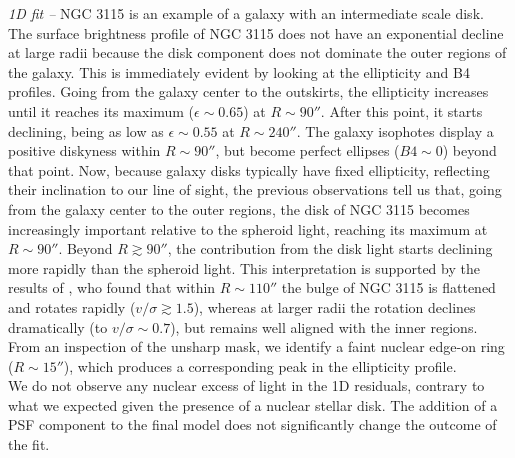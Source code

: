 \documentclass[preprint2]{emulateapj}
\begin{document}
  \emph{1D fit -- }
  NGC 3115 is an example of a galaxy with an intermediate scale disk.
  The surface brightness profile of NGC 3115 does not have an exponential decline at large radii 
  because the disk component does not dominate the outer regions of the galaxy.
  This is immediately evident by looking at the ellipticity and B4 profiles.
  Going from the galaxy center to the outskirts, the ellipticity increases until it reaches its maximum 
  ($\epsilon \sim 0.65$) at $R \sim 90''$. 
  After this point, it starts declining, being as low as $\epsilon \sim 0.55$ at $R \sim 240''$. 
  The galaxy isophotes display a positive diskyness within $R \sim 90''$, but become perfect ellipses 
  ($B4 \sim 0$) beyond that point.
  Now, because galaxy disks typically have fixed ellipticity, reflecting their inclination to our line of sight,
  the previous observations tell us that, going from the galaxy center to the outer regions,
  the disk of NGC 3115 becomes increasingly important relative to the spheroid light, reaching its maximum at $R \sim 90''$.
  Beyond $R \gtrsim 90''$, the contribution from the disk light starts declining more rapidly than the spheroid light.
  This interpretation is supported by the results of \cite{arnold2011n3115},
  who found that within $R \sim 110''$ the bulge of NGC 3115 is flattened and rotates rapidly ($v/\sigma \gtrsim 1.5$),
  whereas at larger radii the rotation declines dramatically (to $v/\sigma \sim 0.7$), 
  but remains well aligned with the inner regions. \\
  From an inspection of the unsharp mask, we identify a faint nuclear edge-on ring ($R \sim 15''$), 
  which produces a corresponding peak in the ellipticity profile. \\
  We do not observe any nuclear excess of light in the 1D residuals, 
  contrary to what we expected given the presence of a nuclear stellar disk. 
  The addition of a PSF component to the final model does not significantly change the outcome of the fit. 
\end{document}

